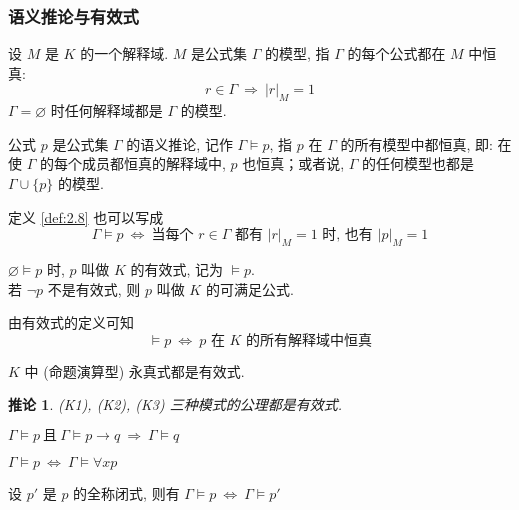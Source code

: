 \documentclass[
    color=black,
    device=normal,
    lang=cn
]{elegantnote}
\newtheorem{deduction}{推论}[subsection]
\begin{document}
\subsubsection{语义推论与有效式}
\begin{definition}[模型]
    设 $M$ 是 $K$ 的一个解释域.  $M$ 是公式集 $\Gamma$ 的模型, 指 $\Gamma$ 的每个公式都在 $M$ 中恒真:
    $$
        r\in \Gamma\ \Rightarrow\  \lvert r\rvert_M=1
    $$
    $\Gamma=\varnothing$ 时任何解释域都是 $\Gamma$ 的模型.
\end{definition}
\begin{definition}[语义推论]\label{def:2.8}
    公式 $p$ 是公式集 $\Gamma$ 的语义推论, 记作 $\Gamma\vDash p$, 指 $p$ 在 $\Gamma$ 的所有模型中都恒真, 即: 在使 $\Gamma$ 的每个成员都恒真的解释域中, $p$ 也恒真；或者说, $\Gamma$ 的任何模型也都是 $\Gamma\cup \{p\}$ 的模型.
\end{definition}
定义 \ref{def:2.8} 也可以写成
$$
    \Gamma\vDash p\ \Leftrightarrow\ \text{当每个 $r\in\Gamma$ 都有 $\lvert r\rvert_M=1$ 时, 也有 $\lvert p\rvert_M = 1$}
$$
\begin{definition}[有效式与满足公式]
    $\varnothing\vDash p$ 时, $p$ 叫做 $K$ 的有效式, 记为 $\vDash p$.\\
    若 $\lnot p$ 不是有效式, 则 $p$ 叫做 $K$ 的可满足公式.
\end{definition}
由有效式的定义可知
$$
    \vDash p \ \Leftrightarrow\ \text{$p$ 在 $K$ 的所有解释域中恒真}
$$
\begin{proposition}
    $K$ 中 (命题演算型) 永真式都是有效式.
\end{proposition}
\begin{deduction}
    (K1), (K2), (K3) 三种模式的公理都是有效式.
\end{deduction}
\begin{proposition}
    $\Gamma\vDash p\ \text{且}\ \Gamma\vDash p\to q\ \Rightarrow\  \Gamma\vDash q$
\end{proposition}
\begin{proposition}
    $\Gamma\vDash p\ \Leftrightarrow\ \Gamma\vDash\forall xp$
\end{proposition}
\begin{proposition}
    设 $p'$ 是 $p$ 的全称闭式, 则有 $\Gamma\vDash p\ \Leftrightarrow\  \Gamma\vDash p'$
\end{proposition}
\end{document}
